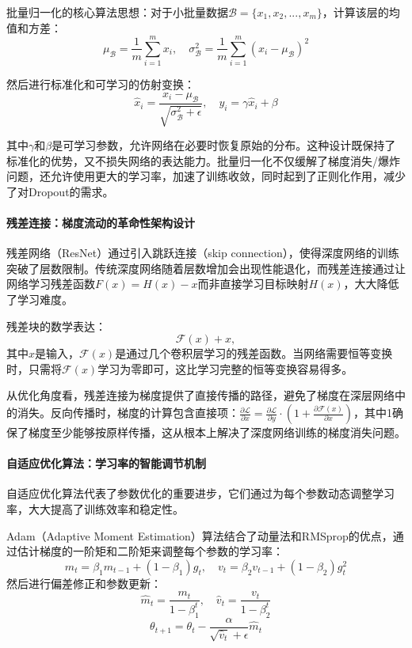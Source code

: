 批量归一化的核心算法思想：对于小批量数据$\mathcal{B} = \{x_1, x_2, ..., x_m\}$，计算该层的均值和方差：
$$\mu_{\mathcal{B}} = \frac{1}{m}\sum_{i=1}^{m} x_i, \quad \sigma_{\mathcal{B}}^2 = \frac{1}{m}\sum_{i=1}^{m}(x_i - \mu_{\mathcal{B}})^2$$

然后进行标准化和可学习的仿射变换：
$$\hat{x}_i = \frac{x_i - \mu_{\mathcal{B}}}{\sqrt{\sigma_{\mathcal{B}}^2 + \epsilon}}, \quad y_i = \gamma\hat{x}_i + \beta$$

其中$\gamma$和$\beta$是可学习参数，允许网络在必要时恢复原始的分布。这种设计既保持了标准化的优势，又不损失网络的表达能力。批量归一化不仅缓解了梯度消失/爆炸问题，还允许使用更大的学习率，加速了训练收敛，同时起到了正则化作用，减少了对Dropout的需求。

\paragraph{残差连接：梯度流动的革命性架构设计}
残差网络（ResNet）通过引入跳跃连接（skip connection），使得深度网络的训练突破了层数限制。传统深度网络随着层数增加会出现性能退化，而残差连接通过让网络学习残差函数$F(x) = H(x) - x$而非直接学习目标映射$H(x)$，大大降低了学习难度。

残差块的数学表达：
$$\mathcal{F}(x) + x,$$
其中$x$是输入，$\mathcal{F}(x)$是通过几个卷积层学习的残差函数。当网络需要恒等变换时，只需将$\mathcal{F}(x)$学习为零即可，这比学习完整的恒等变换容易得多。

从优化角度看，残差连接为梯度提供了直接传播的路径，避免了梯度在深层网络中的消失。反向传播时，梯度的计算包含直接项：$\frac{\partial \mathcal{L}}{\partial x} = \frac{\partial \mathcal{L}}{\partial y} \cdot (1 + \frac{\partial \mathcal{F}(x)}{\partial x})$，其中1确保了梯度至少能够按原样传播，这从根本上解决了深度网络训练的梯度消失问题。

\paragraph{自适应优化算法：学习率的智能调节机制}
自适应优化算法代表了参数优化的重要进步，它们通过为每个参数动态调整学习率，大大提高了训练效率和稳定性。

Adam（Adaptive Moment Estimation）算法结合了动量法和RMSprop的优点，通过估计梯度的一阶矩和二阶矩来调整每个参数的学习率：
$$m_t = \beta_1 m_{t-1} + (1-\beta_1)g_t, \quad v_t = \beta_2 v_{t-1} + (1-\beta_2)g_t^2$$
然后进行偏差修正和参数更新：
$$\hat{m}_t = \frac{m_t}{1-\beta_1^t}, \quad \hat{v}_t = \frac{v_t}{1-\beta_2^t}$$
$$\theta_{t+1} = \theta_t - \frac{\alpha}{\sqrt{\hat{v}_t} + \epsilon}\hat{m}_t$$

